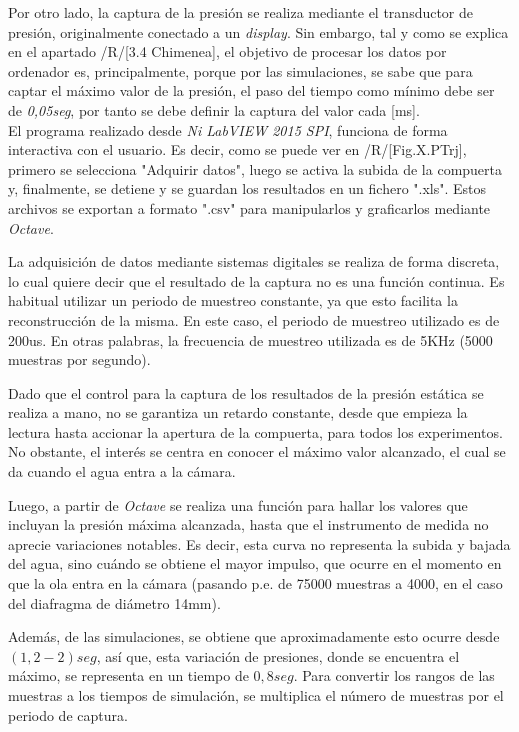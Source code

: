 Por otro lado, la captura de la presión se realiza mediante el
transductor de presión, originalmente conectado a un \emph{display}. Sin
embargo, tal y como se explica en el apartado /R/{[}3.4 Chimenea{]}, el
objetivo de procesar los datos por ordenador es, principalmente, porque
por las simulaciones, se sabe que para captar el máximo valor de la
presión, el paso del tiempo como mínimo debe ser de \emph{0,05seg}, por
tanto se debe definir la captura del valor cada {[}ms{]}.\\

El programa realizado desde \emph{Ni LabVIEW 2015 SPI}, funciona de
forma interactiva con el usuario. Es decir, como se puede ver en
/R/{[}Fig.X.PTrj{]}, primero se selecciona "Adquirir datos", luego se
activa la subida de la compuerta y, finalmente, se detiene y se guardan
los resultados en un fichero ".xls". Estos archivos se exportan a
formato ".csv" para manipularlos y graficarlos mediante \emph{Octave}.

La adquisición de datos mediante sistemas digitales se realiza de forma
discreta, lo cual quiere decir que el resultado de la captura no es una
función continua. Es habitual utilizar un periodo de muestreo constante,
ya que esto facilita la reconstrucción de la misma. En este caso, el
periodo de muestreo utilizado es de 200us. En otras palabras, la
frecuencia de muestreo utilizada es de 5KHz (5000 muestras por segundo).

Dado que el control para la captura de los resultados de la presión
estática se realiza a mano, no se garantiza un retardo constante, desde
que empieza la lectura hasta accionar la apertura de la compuerta, para
todos los experimentos. No obstante, el interés se centra en conocer el
máximo valor alcanzado, el cual se da cuando el agua entra a la cámara.

Luego, a partir de \emph{Octave} se realiza una función para hallar los
valores que incluyan la presión máxima alcanzada, hasta que el
instrumento de medida no aprecie variaciones notables. Es decir, esta
curva no representa la subida y bajada del agua, sino cuándo se obtiene
el mayor impulso, que ocurre en el momento en que la ola entra en la
cámara (pasando p.e. de 75000 muestras a 4000, en el caso del diafragma
de diámetro 14mm).

Además, de las simulaciones, se obtiene que aproximadamente esto ocurre
desde \((1,2-2)seg\), así que, esta variación de presiones, donde se
encuentra el máximo, se representa en un tiempo de \(0,8seg\). Para
convertir los rangos de las muestras a los tiempos de simulación, se
multiplica el número de muestras por el periodo de captura.

